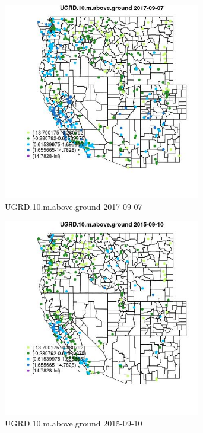 \begin{figure} 
\centering  
\includegraphics[width=0.77\textwidth]{Code_Outputs/Report_ML_input_PM25_Step4_part_e_de_duplicated_aves_compiled_2019-05-20wNAs_MapObsUGRD10maboveground2017-09-07.jpg} 
\caption{\label{fig:Report_ML_input_PM25_Step4_part_e_de_duplicated_aves_compiled_2019-05-20wNAsMapObsUGRD10maboveground2017-09-07}UGRD.10.m.above.ground 2017-09-07} 
\end{figure} 
 

\begin{figure} 
\centering  
\includegraphics[width=0.77\textwidth]{Code_Outputs/Report_ML_input_PM25_Step4_part_e_de_duplicated_aves_compiled_2019-05-20wNAs_MapObsUGRD10maboveground2015-09-10.jpg} 
\caption{\label{fig:Report_ML_input_PM25_Step4_part_e_de_duplicated_aves_compiled_2019-05-20wNAsMapObsUGRD10maboveground2015-09-10}UGRD.10.m.above.ground 2015-09-10} 
\end{figure} 
 

